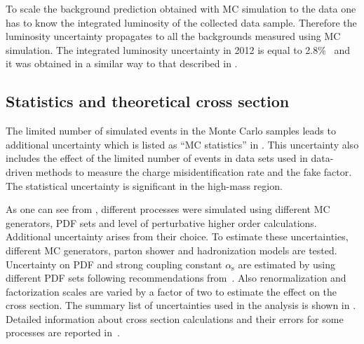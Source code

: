 To scale the background prediction obtained with MC simulation to the data 
one has to know the integrated luminosity of the collected data sample. 
Therefore the luminosity uncertainty propagates to all the backgrounds measured using MC simulation.
The integrated luminosity uncertainty in 2012 is equal to 2.8$\%$~\cite{Aad:2013ucp} 
and it was obtained in a similar way to that described in .

\subsection{Statistics and theoretical cross section}
The limited number of simulated events in the Monte Carlo samples leads to additional uncertainty which is listed as ``MC statistics'' in .
This uncertainty also includes the effect of the limited number of events in data sets used in data-driven methods to measure the charge misidentification rate and the fake factor.
The statistical uncertainty is significant in the high-mass region.

As one can see from , different processes were simulated using different MC generators, PDF sets and level of perturbative higher order calculations.
Additional uncertainty arises from  their choice.
To estimate these uncertainties, different MC generators, parton shower and hadronization models are tested.
Uncertainty on PDF and strong coupling constant $\alpha_{\mathrm{s}}$ are estimated by using different PDF sets following recommendations from~\cite{pdf4lhc}.
Also renormalization and factorization scales are varied by a factor of two to estimate the effect on the cross section.
The summary list of uncertainties used in the analysis is shown in .
Detailed information about cross section calculations and their errors for some processes 
are reported in~\cite{diboson_cross_section,ttW_cross_section,ttV_cross_section}.

